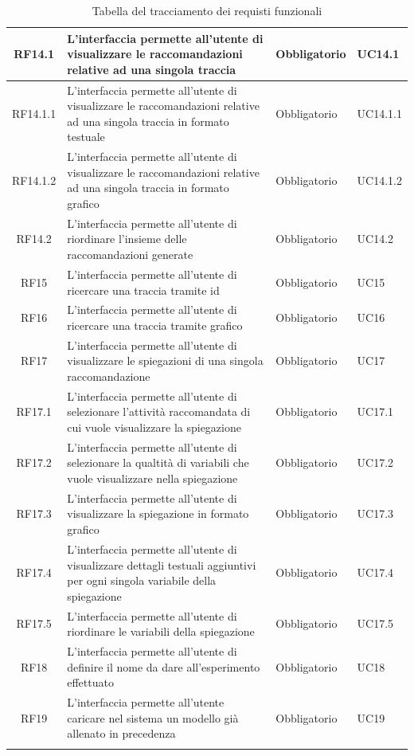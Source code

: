 \begin{longtable}{cp{8cm}ll}
\hline
RF14.1 & L'interfaccia permette all'utente di visualizzare le raccomandazioni relative ad una singola traccia & Obbligatorio & UC14.1 \\
\hline
RF14.1.1 & L'interfaccia permette all'utente di visualizzare le raccomandazioni relative ad una singola traccia in formato testuale & Obbligatorio & UC14.1.1 \\
\hline
RF14.1.2 & L'interfaccia permette all'utente di visualizzare le raccomandazioni relative ad una singola traccia in formato grafico & Obbligatorio & UC14.1.2 \\
\hline
RF14.2 & L'interfaccia permette all'utente di riordinare l'insieme delle raccomandazioni generate & Obbligatorio & UC14.2 \\
\hline
RF15 & L'interfaccia permette all'utente di ricercare una traccia tramite id & Obbligatorio & UC15 \\
\hline
RF16 & L'interfaccia permette all'utente di ricercare una traccia tramite grafico & Obbligatorio & UC16 \\
\hline
RF17 & L'interfaccia permette all'utente di visualizzare le spiegazioni di una singola raccomandazione & Obbligatorio & UC17 \\
\hline
RF17.1 & L'interfaccia permette all'utente di selezionare l'attività raccomandata di cui vuole visualizzare la spiegazione & Obbligatorio & UC17.1 \\
\hline
RF17.2 & L'interfaccia permette all'utente di selezionare la qualtità di variabili che vuole visualizzare nella spiegazione & Obbligatorio & UC17.2 \\
\hline
RF17.3 & L'interfaccia permette all'utente di visualizzare la spiegazione in formato grafico & Obbligatorio & UC17.3 \\
\hline
RF17.4 & L'interfaccia permette all'utente di visualizzare dettagli testuali aggiuntivi per ogni singola variabile della spiegazione & Obbligatorio & UC17.4 \\
\hline
RF17.5 & L'interfaccia permette all'utente di riordinare le variabili della spiegazione  & Obbligatorio & UC17.5 \\
\hline
RF18 & L'interfaccia permette all'utente di definire il nome da dare all'esperimento effettuato  & Obbligatorio & UC18 \\
\hline
RF19 & L'interfaccia permette all'utente caricare nel sistema un modello già allenato in precedenza  & Obbligatorio & UC19 \\
\hline
\hline
\caption{Tabella del tracciamento dei requisti funzionali}
\end{longtable}



